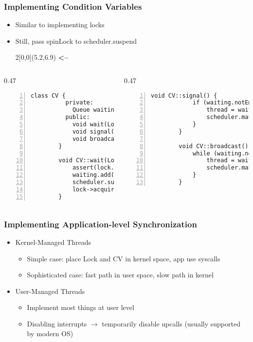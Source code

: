 \documentclass[mathserif,serif,14pt,aspectratio=169]{beamer}
\begin{document}
\begin{frame} [fragile]
	\frametitle{Implementing Condition Variables}
	\begin{itemize}\setlength\itemsep{0.5em}
	\item<1-> Similar to implementing locks
	\item<2-> Still, pass spinLock to scheduler.suspend
		\begin{textblock}{2}[0,0](5.2,6.9)
			{\color{red} \textbf{<--}}	%
		\end{textblock}
	\end{itemize}
	{
	\fontsize{8}{8}\selectfont
	\begin{columns}
		\begin{column}{0.47\textwidth}
		\begin{lstlisting}[style=cstyle, gobble=8, frame=single, 
							numbers=left, numberstyle=\ttfamily]
		class CV {
		  private:
			Queue waiting;
		  public:
			void wait(Lock *lock);
			void signal();
			void broadcast();
		}

		void CV::wait(Lock *lock) {
			assert(lock.isHeld());
			waiting.add(myTCB);
			scheduler.suspend(&lock);
			lock->acquire();
		}
		\end{lstlisting}
		\end{column}
		\begin{column}{0.47\textwidth}
		\begin{lstlisting}[style=cstyle, gobble=8, frame=single, 
							numbers=left, numberstyle=\ttfamily]
		void CV::signal() {
			if (waiting.notEmpty()) {
				thread = waiting.remove();
				scheduler.makeReady(thread);
			}
		}

		void CV::broadcast() {
			while (waiting.notEmpty()) {
				thread = waiting.remove();
				scheduler.makeReady(thread);
			}
		}
		\end{lstlisting}
		\end{column}
	\end{columns}
	}
\end{frame}

\begin{frame} [fragile]
	\frametitle{Implementing Application-level Synchronization}
	\begin{itemize}\setlength\itemsep{0.5em}
	\item<1-> Kernel-Managed Threads
		\begin{itemize}\setlength\itemsep{0.5em}
		\item<1-> Simple case: place Lock and CV in kernel space, app use syscalls
		\item<2-> Sophisticated case: fast path in user space, slow path in kernel
		\end{itemize}
	\item<3-> User-Managed Threads
		\begin{itemize}\setlength\itemsep{0.5em}
		\item Implement most things at user level
		\item Disabling interrupts $\to$ temporarily disable upcalls
			(usually supported by modern OS)
		\end{itemize}
	\end{itemize}
\end{frame}
\end{document}
